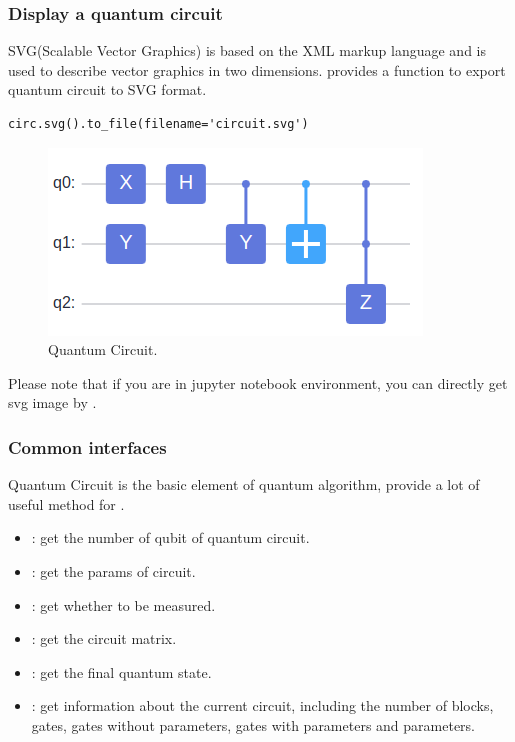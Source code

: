 \subsubsection{Display a quantum circuit}
SVG(Scalable Vector Graphics) is based on the XML markup language and is used to describe vector graphics in two dimensions. \MindQuantum provides a function to export quantum circuit to SVG format.
\begin{lstlisting}
circ.svg().to_file(filename='circuit.svg')
\end{lstlisting}
\begin{figure}[h]
    \begin{center}
        \includegraphics[width=0.9\linewidth]{images/2_4_circuit.png}
    \end{center}
    \caption{Quantum Circuit.}
\end{figure}
Please note that if you are in jupyter notebook environment, you can directly get svg image by .


\subsubsection{Common interfaces}

Quantum Circuit is the basic element of quantum algorithm, \MindQuantum provide a lot of useful method for \Circuit.

\begin{itemize}
    \item \propnqubits: get the number of qubit of quantum circuit.
    \item \propparamsname: get the params of circuit.
    \item \prophasmeasuregate: get whether to be measured.
    \item \methodmatrix: get the circuit matrix.
    \item \methodgetqs: get the final quantum state.
    \item \methodsummary: get information about the current circuit, including the number of blocks, gates, gates without parameters, gates with parameters and parameters.
\end{itemize}

